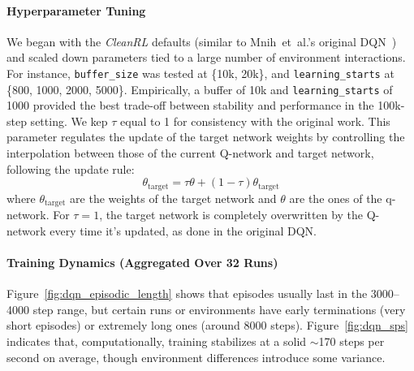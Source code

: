 \paragraph{Hyperparameter Tuning}
We began with the \emph{CleanRL} defaults (similar to Mnih~et~al.'s original DQN~\cite{mnih:atari}) and
scaled down parameters tied to a large number of environment interactions. For instance,
\texttt{buffer\_size} was tested at \{10k, 20k\}, and \texttt{learning\_starts} 
at \{800, 1000, 2000, 5000\}. Empirically, a buffer of 10k 
and \texttt{learning\_starts} of 1000 provided the best trade-off between stability 
and performance in the 100k-step setting. We kep $\tau$ equal to \num{1} for consistency with the original work.
This parameter regulates the update of the target network weights by controlling the interpolation between those of the 
current Q-network and target network, following the update rule:
$$
\theta_{\text{target}} = \tau \theta + (1 - \tau) \theta_{\text{target}}
$$
where $\theta_{\text{target}}$ are the weights of the target network and $\theta$ are the ones of the q-network.
For \(\tau = 1\), the target network is completely overwritten by the Q-network 
every time it's updated, as done in the original DQN.

\paragraph{Training Dynamics (Aggregated Over 32 Runs)}
Figure~\ref{fig:dqn_episodic_length} shows that episodes usually last in the \num{3000}--\num{4000} step range, 
but certain runs or environments have early terminations (very short episodes) or extremely long ones (around \num{8000} steps).  
Figure~\ref{fig:dqn_sps} indicates that, computationally, training stabilizes at a solid 
\(\sim\)\num{170} steps per second on average, though environment differences introduce some variance.

